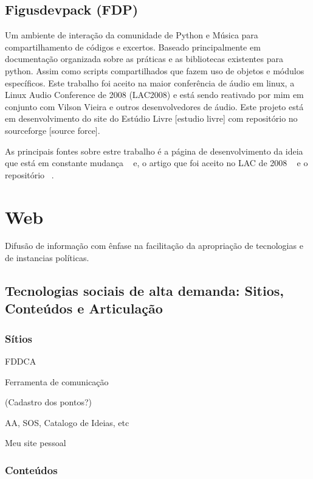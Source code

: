 \subsection{Figusdevpack (FDP)}

Um ambiente de interação da comunidade de Python e Música 
para compartilhamento de códigos e excertos. Baseado principalmente
em documentação organizada sobre as práticas e as bibliotecas
existentes para python. Assim como scripts compartilhados que
fazem uso de objetos e módulos específicos. Este trabalho foi aceito na
maior conferência de áudio em linux, a Linux Audio Conference de 2008
(LAC2008) e está sendo reativado por mim em conjunto com Vilson Vieira
e outros desenvolvedores de áudio. Este projeto está em desenvolvimento
do site do Estúdio Livre [estudio livre] com repositório no sourceforge [source force].

As principais fontes sobre estre trabalho é a página de desenvolvimento da ideia
que está em constante mudança ~\cite{http://estudiolivre.org/tiki-index.php?page=fdp&highlight=fdp fdpel}
e, o artigo que foi aceito no LAC de 2008 ~\cite{http://www.estudiolivre.org/el-gallery_view.php?arquivoId=8221 fdplac2008}
e o repositório ~\cite{http://sourceforge.net/projects/fdpack/develop fdpsf}.



\section{Web}
  Difusão de informação com ênfase na facilitação
  da apropriação de tecnologias e de instancias políticas.

   \subsection{Tecnologias sociais de alta demanda: Sitios, Conteúdos e Articulação}

      \subsubsection{Sítios}

      FDDCA

      Ferramenta de comunicação

      (Cadastro dos pontos?)

      AA, SOS, Catalogo de Ideias, etc

      Meu site pessoal


      \subsubsection{Conteúdos}

